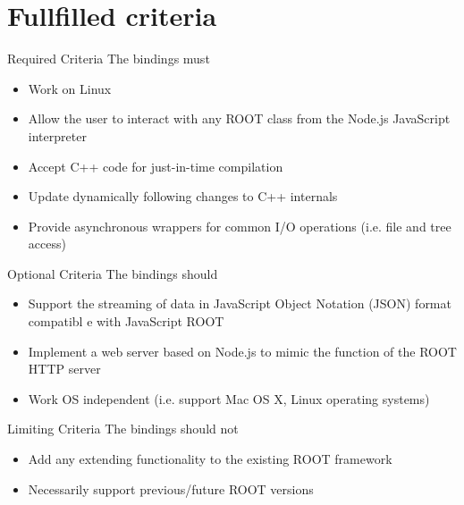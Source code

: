 \section{Fullfilled criteria}

\begin{frame}{Required Criteria}
    The bindings must
     \begin{itemize}
        \item Work on Linux \pause \checkmark \pause
        \item Allow the user to interact with any ROOT class from the Node.js JavaScript interpreter \pause \checkmark \pause
        \item Accept C++ code for just-in-time compilation \pause \checkmark \pause
        \item Update dynamically following changes to C++ internals \pause \checkmark \pause
        \item Provide asynchronous wrappers for common I/O operations (i.e. file and tree access)     \pause \checkmark \pause
     \end{itemize}
\end{frame}

\begin{frame}{Optional Criteria}
    The bindings should
    \begin{itemize}
        \item Support the streaming of data in JavaScript Object Notation (JSON) format compatibl e with JavaScript ROOT \pause \checkmark \pause
        \item Implement a web server based on Node.js to mimic the function of the ROOT HTTP server \pause \checkmark \pause
        \item Work OS independent (i.e. support Mac OS X, Linux operating systems) \pause \checkmark \pause
    \end{itemize}
\end{frame}

\begin{frame}{Limiting Criteria}
    The bindings should not
    \begin{itemize}
        \item Add any extending functionality to the existing ROOT framework \pause \checkmark \pause
        \item Necessarily support previous/future ROOT versions \pause \checkmark \pause
    \end{itemize}
\end{frame}
